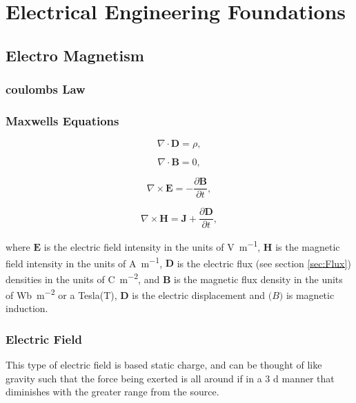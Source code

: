 
\chapter{Electrical Engineering Foundations}


\section{Electro Magnetism}

\subsection{coulombs Law}

\subsection{Maxwells Equations}

\begin{equation}
\nabla \cdot \mathbf{D} = \rho,
\end{equation}

\begin{equation}
\nabla \cdot \mathbf{B} = 0,
\end{equation}

\begin{equation}
\nabla \times \mathbf{E} = -\frac{\partial \mathbf{B}}{\partial t},
\end{equation}

\begin{equation}
\nabla \times \mathbf{H} = \mathbf{J} + \frac{\partial \mathbf{D}}{\partial t}, 
\end{equation}

where $\mathbf{E} $ is the electric field intensity in the units of \unit{\volt\per\meter}, $\mathbf{H}$ is the magnetic field intensity in the units of \unit{\ampere\per\meter}, $\mathbf{D}$ is the electric flux (see section \ref{sec:Flux}) densities in the units of \unit{\coulomb\per\meter\squared}, and $\mathbf{B}$ is the magnetic flux density in the units of \unit{\weber\per\meter\squared} or a Tesla(\unit{\tesla}), $\mathbf{D}$ is the electric displacement and $\mathbf(B)$ is magnetic induction.
\subsection{Electric Field}
This type of electric field is based static charge, and can be thought of like gravity such that the force being exerted is all around if in a 3 d manner that diminishes with the greater range from the source.

